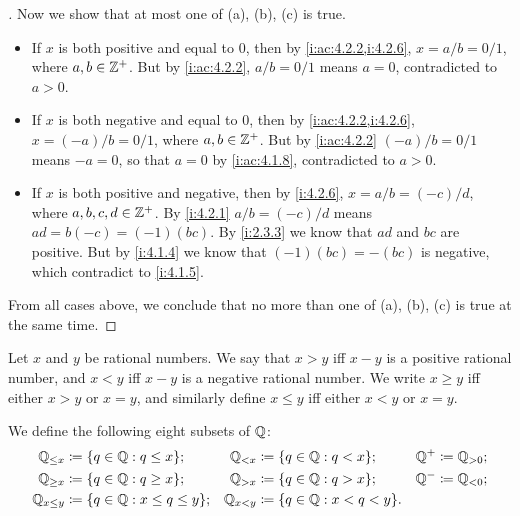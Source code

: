 \begin{proof}[]
  Now we show that at most one of (a), (b), (c) is true.
  \begin{itemize}
    \item If \(x\) is both positive and equal to \(0\), then by \cref{i:ac:4.2.2,i:4.2.6}, \(x = a / b = 0 / 1\), where \(a, b \in \mathbb{Z}^+\).
          But by \cref{i:ac:4.2.2}, \(a / b = 0 / 1\) means \(a = 0\), contradicted to \(a > 0\).
    \item If \(x\) is both negative and equal to \(0\), then by \cref{i:ac:4.2.2,i:4.2.6}, \(x = (-a) / b = 0 / 1\), where \(a, b \in \mathbb{Z}^+\).
          But by \cref{i:ac:4.2.2} \((-a) / b = 0 / 1\) means \(-a = 0\), so that \(a = 0\) by \cref{i:ac:4.1.8}, contradicted to \(a > 0\).
    \item If \(x\) is both positive and negative, then by \cref{i:4.2.6}, \(x = a / b = (-c) / d\), where \(a, b, c, d \in \mathbb{Z}^+\).
          By \cref{i:4.2.1} \(a / b = (-c) / d\) means \(ad = b(-c) = (-1)(bc)\).
          By \cref{i:2.3.3} we know that \(ad\) and \(bc\) are positive.
          But by \cref{i:4.1.4} we know that \((-1)(bc) = -(bc)\) is negative, which contradict to \cref{i:4.1.5}.
  \end{itemize}
  From all cases above, we conclude that no more than one of (a), (b), (c) is true at the same time.
\end{proof}

\begin{defn}\label{i:4.2.8}
  Let \(x\) and \(y\) be rational numbers.
  We say that \(x > y\) iff \(x - y\) is a positive rational number, and \(x < y\) iff \(x - y\) is a negative rational number.
  We write \(x \geq y\) iff either \(x > y\) or \(x = y\), and similarly define \(x \leq y\) iff either \(x < y\) or \(x = y\).

  We define the following eight subsets of \(\mathbb{Q}\):
  \begin{align*}
    \Q_{\leq x}   & \coloneqq \set{q \in \Q : q \leq x};        & \Q_{< x}   & \coloneqq \set{q \in \Q : q < x};     & \Q^+ & \coloneqq \Q_{> 0}; \\
    \Q_{\geq x}   & \coloneqq \set{q \in \Q : q \geq x};        & \Q_{> x}   & \coloneqq \set{q \in \Q : q > x};     & \Q^- & \coloneqq \Q_{< 0}; \\
    \Q_{x \leq y} & \coloneqq \set{q \in \Q : x \leq q \leq y}; & \Q_{x < y} & \coloneqq \set{q \in \Q : x < q < y}. &      &
  \end{align*}
\end{defn}

